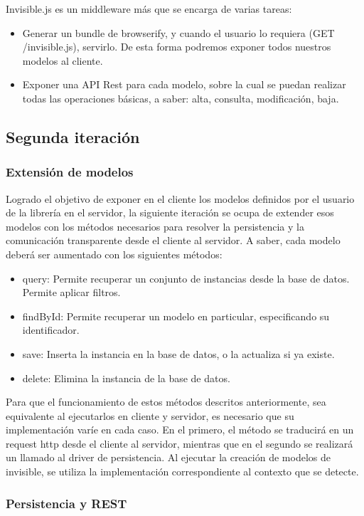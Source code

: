 \documentclass[doc,helv,longtable]{article}
\begin{document}
Invisible.js es un middleware más que se encarga de varias tareas:
\begin{itemize}
\item  Generar un bundle de browserify, y cuando el usuario lo requiera (GET /invisible.js), servirlo. De esta forma podremos exponer todos nuestros modelos al cliente.
\item  Exponer una API Rest para cada modelo, sobre la cual se puedan realizar todas las operaciones básicas, a saber: alta, consulta, modificación, baja. 

\end{itemize}
\subsection{Segunda iteración}
\subsubsection{Extensión de modelos}


Logrado el objetivo de exponer en el cliente los modelos definidos por el usuario de la librería en el servidor, la siguiente iteración se ocupa de extender esos modelos con los métodos necesarios para resolver la persistencia y la comunicación transparente desde el cliente al servidor. A saber, cada modelo deberá ser aumentado con los siguientes métodos:
\begin{itemize}
\item  query: Permite recuperar un conjunto de instancias desde la base de datos. Permite aplicar filtros.
\item  findById: Permite recuperar un modelo en particular, especificando su identificador.
\item  save: Inserta la instancia en la base de datos, o la actualiza si ya existe.
\item  delete: Elimina la instancia de la base de datos.

\end{itemize}


Para que el funcionamiento de estos métodos descritos anteriormente, sea equivalente al ejecutarlos en cliente y servidor, es necesario que su implementación varíe en cada caso. En el primero, el método se traducirá en un request http desde el cliente al servidor, mientras que en el segundo se realizará un llamado al driver de persistencia. Al ejecutar la creación de modelos de invisible, se utiliza la implementación correspondiente al contexto que se detecte.\subsubsection{Persistencia y REST}
\end{document}
